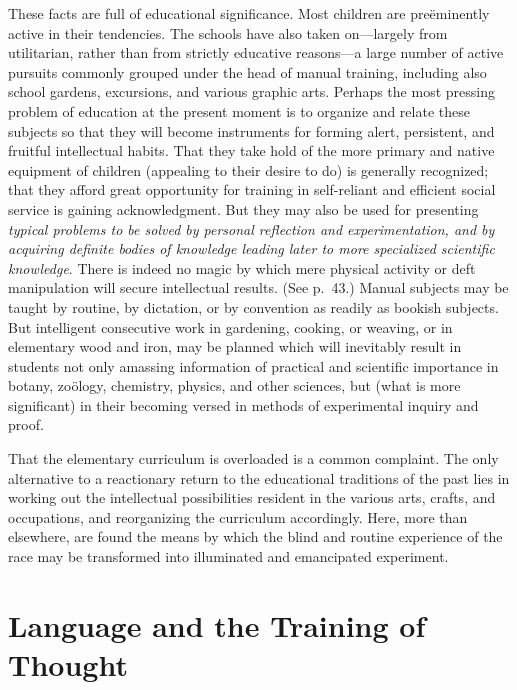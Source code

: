 \documentclass[letterpaper]{book}
\begin{document}

These facts are full of educational significance. Most children are
preëminently active in their tendencies. The schools have also taken
on---largely from utilitarian, rather than from strictly educative
reasons---a large number of active pursuits commonly grouped under the
head of manual training, including also school gardens, excursions, and
various graphic arts. Perhaps the most pressing problem of education at
the present moment is to organize and relate these subjects so that they
will become instruments for forming alert, persistent, and fruitful
intellectual habits. That they take hold of the more primary and native
equipment of children (appealing to their desire to do) is generally
recognized; that they afford great opportunity for training in
self-reliant and efficient social service is gaining acknowledgment. But
they may also be used for presenting \emph{typical problems to be solved
by personal reflection and experimentation, and by acquiring definite
bodies of knowledge leading later to more specialized scientific
knowledge}. There is indeed no magic by which mere physical activity or
deft manipulation will secure intellectual results. (See p.\ 43.) Manual
subjects may be taught by routine, by dictation, or by convention as
readily
as bookish subjects. But intelligent consecutive work in gardening,
cooking, or weaving, or in elementary wood and iron, may be planned
which will inevitably result in students not only amassing information
of practical and scientific importance in botany, zoölogy, chemistry,
physics, and other sciences, but (what is more significant) in their
becoming versed in methods of experimental inquiry and proof.


That the elementary curriculum is overloaded is a common complaint. The
only alternative to a reactionary return to the educational traditions
of the past lies in working out the intellectual possibilities resident
in the various arts, crafts, and occupations, and reorganizing the
curriculum accordingly. Here, more than elsewhere, are found the means
by which the blind and routine experience of the race may be transformed
into illuminated and emancipated
experiment.

\chapter{Language and the Training of Thought}
\end{document}
